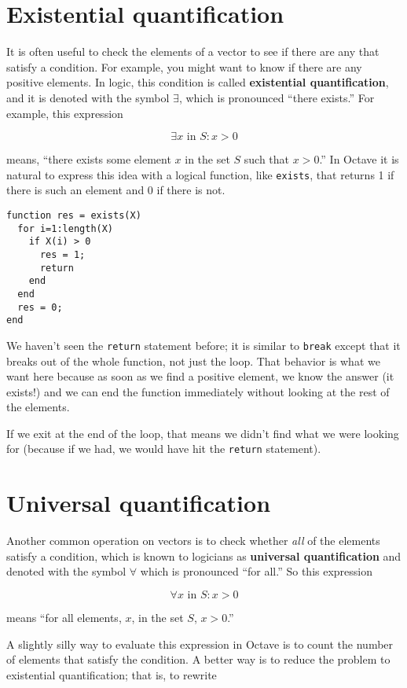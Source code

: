 \section{Existential quantification}

It is often useful to check the elements of a vector to see if there
are any that satisfy a condition. For example, you might want to
know if there are any positive elements. In logic, this condition
is called {\bf existential quantification}, and it is denoted with
the symbol $\exists$, which is pronounced ``there exists.'' For example,
this expression

\[ \exists x \mbox{~in~} S: x>0 \]

means, ``there exists some element $x$ in the set $S$ such that
$x>0$.'' In Octave it is natural to express this idea with a logical
function, like {\tt exists}, that returns 1 if there is such an
element and 0 if there is not.

\begin{verbatim}
function res = exists(X)
  for i=1:length(X)
    if X(i) > 0
      res = 1;
      return
    end
  end
  res = 0;
end
\end{verbatim}

We haven't seen the {\tt return} statement before; it is similar
to {\tt break} except that it breaks out of the whole function, not
just the loop. That behavior is what we want here because as soon
as we find a positive element, we know the answer (it exists!) and
we can end the function immediately without looking at the rest
of the elements.

If we exit at the end of the loop, that means we didn't find what
we were looking for (because if we had, we would have hit the
{\tt return} statement).



\section{Universal quantification}

Another common operation on vectors is to check whether {\em all}
of the elements satisfy a condition, which is known to
logicians as {\bf universal quantification} and denoted with
the symbol $\forall$ which is pronounced ``for all.'' So this
expression

\[ \forall x \mbox{~in~} S: x>0 \]

means ``for all elements, $x$, in the set $S$, $x>0$.''

A slightly silly way to evaluate this expression in Octave is to
count the number of elements that satisfy the condition.
A better way is to reduce the problem to
existential quantification; that is, to rewrite

